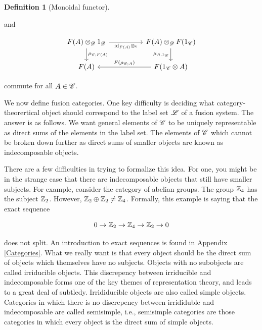 \documentclass{article}
\theoremstyle{definition}
\newtheorem*{definition}{Definition}
\numberwithin{figure}{section}
\begin{document}
\begin{definition}[Monoidal functor]
\begin{enumerate}
and

\[\begin{tikzcd}
	{F(A)\otimes_{\Dcat}1_{\Dcat}} && {F(A)\otimes_{\Dcat}F(1_{\Ccat})} \\
	{F(A)} && {F(1_{\Ccat}\otimes A)}
	\arrow["{\rho_{\Ccat;F(A)}}", from=1-1, to=2-1]
	\arrow["{F(\rho_{\Ccat;A})}"', from=2-3, to=2-1]
	\arrow["{\mu_{A,1_{\Ccat}}}"', from=1-3, to=2-3]
	\arrow["{\text{id}_{F(A)}\otimes\epsilon}"', from=1-1, to=1-3]
\end{tikzcd}\]

commute for all $A\in \mathscr{C}$.
\end{enumerate}

\raggedleft\qedsymbol{}
\end{definition}

We now define fusion categories. One key difficulty is deciding what category-theorertical object should correspond to the label set $\mathscr{L}$ of a fusion system. The answer is as follows. We want general elements of $\mathscr{C}$ to be uniquely representable as direct sums of the elements in the label set. The elements of $\mathscr{C}$ which cannot be broken down further as direct sums of smaller objects are known as indecomposable objects.

There are a few difficulties in trying to formalize this idea. For one, you might be in the strange case that there are indecomposable objects that still have smaller subjects. For example, consider the category of abelian groups. The group $\mathbb{Z}_4$ has the subject $\mathbb{Z}_2$. However, $\mathbb{Z}_2\oplus\mathbb{Z}_2\neq \mathbb{Z}_4$. Formally, this example is saying that the exact sequence

$$0\to \mathbb{Z}_2\to \mathbb{Z}_4\to\mathbb{Z}_2\to 0$$

does not split. An introduction to exact sequences is found in Appendix \ref{Categories}. What we really want is that every object should be the direct sum of objects which themselves have no subjects. Objects with no subobjects are called irriducible objects. This discrepency between irriducible and indecomposable forms one of the key themes of representation theory, and leads to a great deal of subtledy. Irrididucible objects are also called simple objects. Categories in which there is no discrepency between irrididuble and indecomposable are called semisimple, i.e., semisimple categories are those categories in which every object is the direct sum of simple objects.
\end{document}
